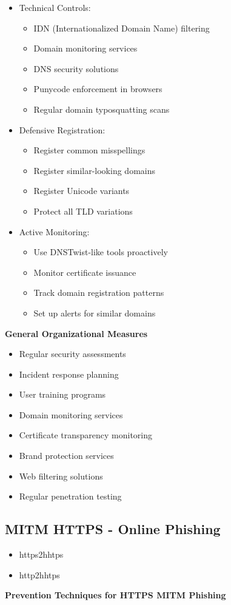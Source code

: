 \begin{itemize}
\item Technical Controls:
\begin{itemize}
\item IDN (Internationalized Domain Name) filtering
\item Domain monitoring services
\item DNS security solutions
\item Punycode enforcement in browsers
\item Regular domain typosquatting scans
\end{itemize}
\item Defensive Registration:
\begin{itemize}
\item Register common misspellings
\item Register similar-looking domains
\item Register Unicode variants
\item Protect all TLD variations
\end{itemize}
\item Active Monitoring:
\begin{itemize}
\item Use DNSTwist-like tools proactively
\item Monitor certificate issuance
\item Track domain registration patterns
\item Set up alerts for similar domains
\end{itemize}
\end{itemize}
\textbf{General Organizational Measures}
\begin{itemize}
\item Regular security assessments
\item Incident response planning
\item User training programs
\item Domain monitoring services
\item Certificate transparency monitoring
\item Brand protection services
\item Web filtering solutions
\item Regular penetration testing
\end{itemize}

\subsection{MITM HTTPS - Online Phishing}
\begin{itemize}
    \item https2hhtps
    \item http2hhtps
\end{itemize}
\textbf{Prevention Techniques for HTTPS MITM Phishing}

